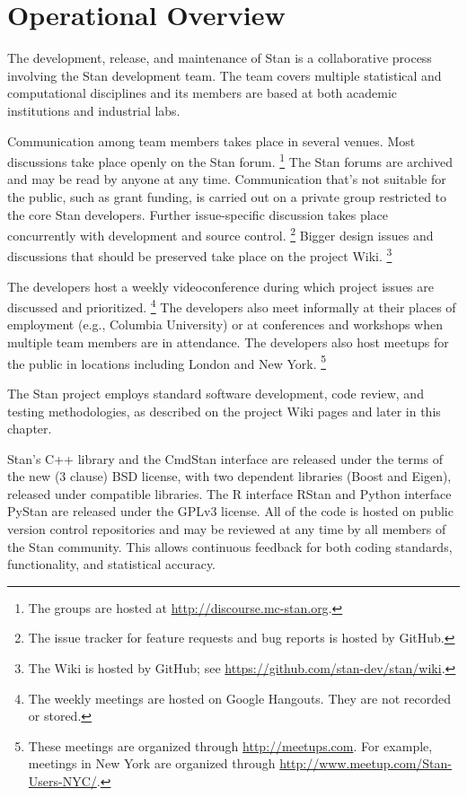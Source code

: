 \section{Operational Overview}

The development, release, and maintenance of Stan is a collaborative
process involving the Stan development team.  The team covers multiple
statistical and computational disciplines and its members are based at
both academic institutions and industrial labs.

Communication among team members takes place in several venues.  Most
discussions take place openly on the Stan forum.%
%
\footnote{The groups are hosted at \url{http://discourse.mc-stan.org}.}
%
The Stan forums are archived and may be read by anyone at any
time. Communication that's not suitable for the public, such as grant
funding, is carried out on a private group restricted to the core Stan
developers. Further issue-specific discussion takes place concurrently
with development and source control.%
%
\footnote{The issue tracker for feature requests and bug reports is
  hosted by GitHub.}
%
Bigger design issues and discussions that should be preserved take
place on the project Wiki.%
%
\footnote{The Wiki is hosted by GitHub; see
  \url{https://github.com/stan-dev/stan/wiki}.}

The developers host a weekly videoconference during which project
issues are discussed and prioritized.%
%
\footnote{The weekly meetings are hosted on Google Hangouts.  They are
  not recorded or stored.}
%
The developers also meet informally at their places of employment
(e.g., Columbia University) or at conferences and workshops when
multiple team members are in attendance.  The developers also host
meetups for the public in locations including London and New York.%
%
\footnote{These meetings are organized through
  \url{http://meetups.com}.  For example, meetings in New York are
  organized through \url{http://www.meetup.com/Stan-Users-NYC/}.}

The Stan project employs standard software development, code review,
and testing methodologies, as described on the project Wiki pages
and later in this chapter.

Stan's C++ library and the CmdStan interface are released under the
terms of the new (3 clause) BSD license, with two dependent libraries
(Boost and Eigen), released under compatible libraries. The R
interface RStan and Python interface PyStan are released under the
GPLv3 license. All of the code is hosted on public version control
repositories and may be reviewed at any time by all members of the
Stan community.  This allows continuous feedback for both coding
standards, functionality, and statistical accuracy.

